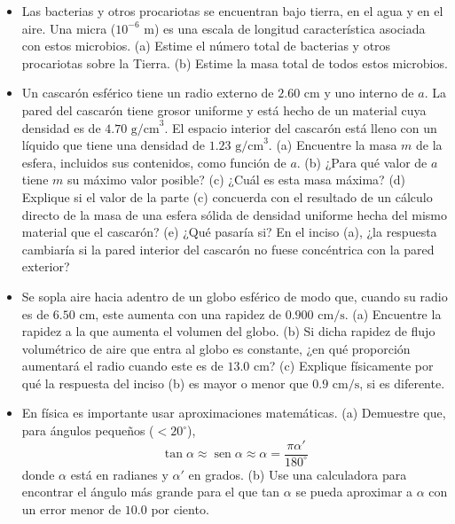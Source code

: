 \documentclass[11pt,a4paper]{article}
\begin{document}
\begin{itemize}
    \item[\textbf{33.}] Las bacterias y otros procariotas se encuentran bajo tierra, en el agua y en el aire. Una micra ($10^{-6} \text{ m}$) es una escala de longitud característica asociada con estos microbios. (a) Estime el número total de bacterias y otros procariotas sobre la Tierra. (b) Estime la masa total de todos estos microbios.
    \vspace*{8cm}
    
    \item[\textbf{34.}] Un cascarón esférico tiene un radio externo de $2.60 \text{ cm}$ y uno interno de $a$. La pared del cascarón tiene grosor uniforme y está hecho de un material cuya densidad es de $4.70 \text{ g/cm}^3$. El espacio interior del cascarón está lleno con un líquido que tiene una densidad de $1.23 \text{ g/cm}^3$. (a) Encuentre la masa $m$ de la esfera, incluidos sus contenidos, como función de $a$. (b) ¿Para qué valor de $a$ tiene $m$ su máximo valor posible? (c) ¿Cuál es esta masa máxima? (d) Explique si el valor de la parte (c) concuerda con el resultado de un cálculo directo de la masa de una esfera sólida de densidad uniforme hecha del mismo material que el cascarón? (e) ¿Qué pasaría si? En el inciso (a), ¿la respuesta cambiaría si la pared interior del cascarón no fuese concéntrica con la pared exterior?
    \vspace*{12cm}
    
    \item[\textbf{35.}] Se sopla aire hacia adentro de un globo esférico de modo que, cuando su radio es de $6.50 \text{ cm}$, este aumenta con una rapidez de $0.900 \text{ cm/s}$. (a) Encuentre la rapidez a la que aumenta el volumen del globo. (b) Si dicha rapidez de flujo volumétrico de aire que entra al globo es constante, ¿en qué proporción aumentará el radio cuando este es de $13.0 \text{ cm}$? (c) Explique físicamente por qué la respuesta del inciso (b) es mayor o menor que $0.9 \text{ cm/s}$, si es diferente.
    \vspace*{8cm}
    
    \item[\textbf{36.}] En física es importante usar aproximaciones matemáticas. (a) Demuestre que, para ángulos pequeños ($< 20^\circ$),
    $$ \tan \alpha \approx \operatorname{sen} \alpha \approx \alpha = \frac{\pi \alpha'}{180^\circ} $$
    donde $\alpha$ está en radianes y $\alpha'$ en grados. (b) Use una calculadora para encontrar el ángulo más grande para el que tan $\alpha$ se pueda aproximar a $\alpha$ con un error menor de $10.0$ por ciento.
    \vspace*{8cm}
    

\end{itemize}
\end{document}
